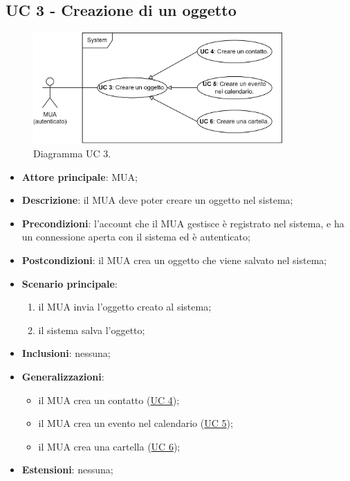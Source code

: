 \subsection{UC 3 - Creazione di un oggetto} \label{sec:UC3}
    \begin{figure}[h]
        \includegraphics[width=0.85\textwidth]{sections/uc_imgs/UC03.png}
        \centering
        \caption{Diagramma UC 3.}
    \end{figure}
    \begin{itemize}
        \item \textbf{Attore principale}: MUA;
        \item \textbf{Descrizione}: il MUA deve poter creare un oggetto nel sistema;
        \item \textbf{Precondizioni}: l’account che il MUA gestisce è registrato nel sistema, e ha un connessione aperta con il sistema ed è autenticato;
        \item \textbf{Postcondizioni}: il MUA crea un oggetto che viene salvato nel sistema;
        \item \textbf{Scenario principale}:
            \begin{enumerate}
                \item il MUA invia l'oggetto creato al sistema;
                \item il sistema salva l'oggetto;
            \end{enumerate}
        \item \textbf{Inclusioni}: nessuna;
        \item \textbf{Generalizzazioni}:
            \begin{itemize}
                \item il MUA crea un contatto (\hyperref[sec:UC4]{UC 4});
                \item il MUA crea un evento nel calendario (\hyperref[sec:UC5]{UC 5});
                \item il MUA crea una cartella (\hyperref[sec:UC6]{UC 6});
            \end{itemize}
        \item \textbf{Estensioni}: nessuna;
    \end{itemize}

